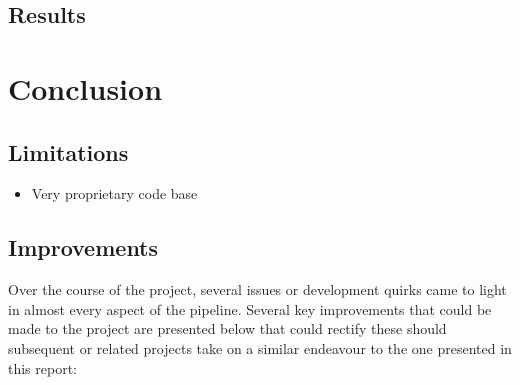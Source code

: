 \documentclass[conference]{IEEEtran}
\begin{document}
\subsection{Results}
\label{subsec:results}



\section{Conclusion}
\label{sec:conclusion}

\subsection{Limitations}
\label{subsec:limitations}

\begin{itemize}
    \item Very proprietary code base
\end{itemize}

\subsection{Improvements}

Over the course of the project, several issues or development quirks came to light in almost every aspect of the pipeline. Several key improvements that could be made to the project are presented below that could rectify these should subsequent or related projects take on a similar endeavour to the one presented in this report:
\end{document}

